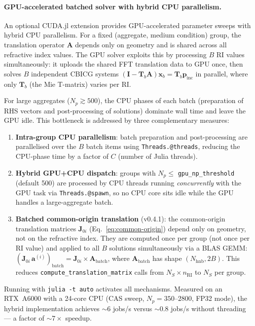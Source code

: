 \documentclass[11pt,a4paper]{article}
\begin{document}
\paragraph{GPU-accelerated batched solver with hybrid CPU parallelism.}
An optional CUDA.jl extension provides GPU-accelerated parameter sweeps with hybrid CPU parallelism.
For a fixed (aggregate, medium condition) group, the translation operator $\mathbf{A}$ depends only on geometry and is shared across all refractive index values.
The GPU solver exploits this by processing $B$ RI values simultaneously: it uploads the shared FFT translation data to GPU once, then solves $B$ independent CBICG systems $(\mathbf{I} - \mathbf{T}_b \mathbf{A})\bm{x}_b = \mathbf{T}_b\bm{p}_\mathrm{inc}$ in parallel, where only $\mathbf{T}_b$ (the Mie T-matrix) varies per RI.

For large aggregates ($N_p \gtrsim 500$), the CPU phases of each batch (preparation of RHS vectors and post-processing of solutions) dominate wall time and leave the GPU idle.
This bottleneck is addressed by three complementary measures:
\begin{enumerate}
  \item \textbf{Intra-group CPU parallelism}: batch preparation and post-processing are parallelised over the $B$ batch items using \texttt{Threads.@threads}, reducing the CPU-phase time by a factor of $C$ (number of Julia threads).
  \item \textbf{Hybrid GPU+CPU dispatch}: groups with $N_p \leq$ \texttt{gpu\_np\_threshold} (default 500) are processed by CPU threads running \emph{concurrently} with the GPU task via \texttt{Threads.@spawn}, so no CPU core sits idle while the GPU handles a large-aggregate batch.
  \item \textbf{Batched common-origin translation} (v0.4.1): the common-origin translation matrices $\mathbf{J}_{0i}$ (Eq.~\eqref{eq:common-origin}) depend only on geometry, not on the refractive index.
  They are computed once per group (not once per RI value) and applied to all $B$ solutions simultaneously via a BLAS GEMM: $(\mathbf{J}_{0i}\,\bm{a}^{(i)})_\text{batch} = \mathbf{J}_{0i} \times \bm{A}_\text{batch}$, where $\bm{A}_\text{batch}$ has shape $(N_\text{hnb}, 2B)$.
  This reduces \texttt{compute\_translation\_matrix} calls from $N_S \times n_\text{RI}$ to $N_S$ per group.
\end{enumerate}
Running with \texttt{julia -t auto} activates all mechanisms.
Measured on an RTX~A6000 with a 24-core CPU (CAS sweep, $N_p = 350$--$2800$, FP32 mode), the hybrid implementation achieves ${\sim}6$ jobs/s versus ${\sim}0.8$ jobs/s without threading — a factor of ${\sim}7\times$ speedup.
\end{document}
